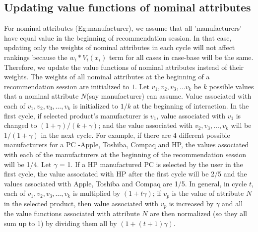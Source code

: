 \subsection{Updating value functions of nominal attributes}
\label{sec:valueFunc}
For nominal attributes (Eg:manufacturer), we assume that all 'manufacturers' have equal value in the beginning of recommendation session.
In that case, updating only the weights of nominal attributes in each cycle will not affect rankings because the $w_i*V_i(x_i)$ term for all cases in case-base will be the same.
Therefore, we update the value functions of nominal attributes instead of their weights.
The weights of all nominal attributes at the beginning of a recommendation session are initialized to $1$.
Let $v_1, v_2, v_3,\hdots v_k$ be $k$ possible values that a nominal attribute $N$(say manufacturer) can assume.
Value associated with each of $v_1, v_2, v_3,\hdots, v_k$ is initialized to $1/k$ at the beginning of interaction.
In the first cycle, if selected product's manufacturer is $v_1$, value associated with $v_1$ is changed to $(1+\gamma)/(k+\gamma)$; and the value associated with $v_2, v_3, \hdots, v_k$ will be $1/(1+\gamma)$ in the next cycle.
For example, if there are 4 different possible manufacturers for a PC -Apple, Toshiba, Compaq and HP, the values associated with each of the manufacturers at the beginning of the recommendation session will be 1/4.
Let $\gamma$ = 1.
If a HP manufactured PC is selected by the user in the first cycle, the value associated with HP after the first cycle will be 2/5 and the values associated with Apple, Toshiba and Compaq are 1/5.
In general, in cycle $t$,  each of $v_1, v_2, v_3,\hdots, v_k$ is multiplied by $(1 + t\gamma)$; if $v_p$ is the value of attribute $N$ in the selected product, then value associated with $v_p$ is increased by $\gamma$ and all the value functions associated with attribute $N$ are then normalized (so they all sum up to 1)  by dividing them all by $(1+ (t+1)\gamma)$.


%





